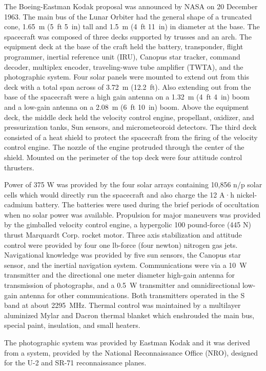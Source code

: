 The Boeing-Eastman Kodak proposal was announced by NASA on 20 December
1963. The main bus of the Lunar Orbiter had the general shape of a
truncated cone, 1.65~m (5~ft 5~in) tall and 1.5~m (4~ft 11~in) in
diameter at the base. The spacecraft was composed of three decks
supported by trusses and an arch. The equipment deck at the base of the
craft held the battery, transponder, flight programmer, inertial
reference unit (IRU), Canopus star tracker, command decoder, multiplex
encoder, traveling-wave tube amplifier (TWTA), and the photographic
system. Four solar panels were mounted to extend out from this deck with
a total span across of 3.72~m (12.2~ft). Also extending out from the
base of the spacecraft were a high gain antenna on a 1.32~m (4~ft 4~in)
boom and a low-gain antenna on a 2.08~m (6~ft 10~in) boom. Above the
equipment deck, the middle deck held the velocity control engine,
propellant, oxidizer, and pressurization tanks, Sun sensors, and
micrometeoroid detectors. The third deck consisted of a heat shield to
protect the spacecraft from the firing of the velocity control engine.
The nozzle of the engine protruded through the center of the shield.
Mounted on the perimeter of the top deck were four attitude control
thrusters.

Power of 375 W was provided by the four solar arrays containing 10,856
n/p solar cells which would directly run the spacecraft and also charge
the 12 A·h nickel-cadmium battery. The batteries were used during the
brief periods of occultation when no solar power was available.
Propulsion for major maneuvers was provided by the gimballed velocity
control engine, a hypergolic 100 pound-force (445 N) thrust Marquardt
Corp. rocket motor. Three axis stabilization and attitude control were
provided by four one lb-force (four newton) nitrogen gas jets.
Navigational knowledge was provided by five sun sensors, the Canopus
star sensor, and the inertial navigation system. Communications were via
a 10~W transmitter and the directional one meter diameter high-gain
antenna for transmission of photographs, and a 0.5~W transmitter and
omnidirectional low-gain antenna for other communications. Both
transmitters operated in the S band at about 2295~MHz. Thermal control
was maintained by a multilayer aluminized Mylar and Dacron thermal
blanket which enshrouded the main bus, special paint, insulation, and
small heaters.

The photographic system was provided by Eastman Kodak and it was derived
from a system, provided by the National Reconnaissance Office (NRO),
designed for the U-2 and SR-71 reconnaissance planes.

